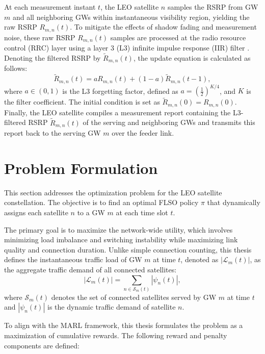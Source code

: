 At each measurement instant $t$, the LEO satellite \( n \) samples the RSRP from GW \( m \) and all neighboring GWs within instantaneous visibility region, yielding the raw RSRP $R_{m,n}(t)$. To mitigate the effects of shadow fading and measurement noise, these raw RSRP $R_{m,n}(t)$ samples are processed at the radio resource control (RRC) layer using a layer 3 (L3) infinite impulse response (IIR) filter \cite{rel_38331}. Denoting the filtered RSRP by $\widetilde{R}_{m,n}(t)$, the update equation is calculated as follows:
\begin{equation}
  \widetilde{R}_{m,n}(t) = a{R}_{m,n}(t) + (1 - a)\widetilde{R}_{m,n}(t-1),
  \label{eq:L3filter_new}
\end{equation}
where $a \in (0,1)$ is the L3 forgetting factor, defined as $a = \left(\frac{1}{2}\right)^{K/4}$, and $K$ is the filter coefficient. The initial condition is set as $\widetilde{R}_{m,n}(0) = R_{m,n}(0)$. Finally, the LEO satellite compiles a measurement report containing the L3-filtered RSRP $\widetilde{R}_{m,n}(t)$ of the serving and neighboring GWs and transmits this report back to the serving GW \( m \) over the feeder link.

\section{Problem Formulation}
\quad This section addresses the optimization problem for the LEO satellite constellation. The objective is to find an optimal FLSO policy $\pi$ that dynamically assigns each satellite $n$ to a GW $m$ at each time slot $t$.

The primary goal is to maximize the network-wide utility, which involves minimizing load imbalance and switching instability while maximizing link quality and connection duration. Unlike simple connection counting, this thesis defines the instantaneous traffic load of GW $m$ at time $t$, denoted as $|\mathcal{L}_m(t)|$, as the aggregate traffic demand of all connected satellites:
\begin{equation}
|\mathcal{L}_m(t)| = \sum_{n \in \mathcal{S}_m(t)} |\psi_n(t)|,
\label{eq:gw_load_traffic}
\end{equation}
where $\mathcal{S}_m(t)$ denotes the set of connected satellites served by GW $m$ at time $t$ and $|\psi_n(t)|$ is the dynamic traffic demand of satellite $n$.

To align with the MARL framework, this thesis formulates the problem as a maximization of cumulative rewards. The following reward and penalty components are defined:


